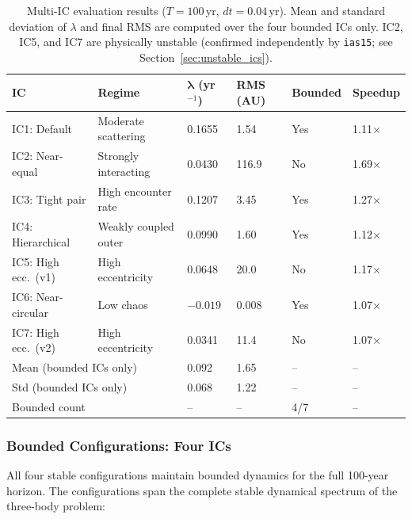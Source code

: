 \documentclass[12pt]{article}
\begin{document}
\begin{table}[H]
\centering
\caption{Multi-IC evaluation results ($T = 100$\,yr, $dt = 0.04$\,yr). Mean and
standard deviation of $\lambda$ and final RMS are computed over the four bounded ICs
only. IC2, IC5, and IC7 are physically unstable (confirmed independently by
\texttt{ias15}; see Section~\ref{sec:unstable_ics}).}
\label{tab:multi_ic}
\begin{tabular}{@{}llllll@{}}
\toprule
\textbf{IC} & \textbf{Regime} & $\boldsymbol{\lambda}$ (yr$^{-1}$) & \textbf{RMS (AU)} & \textbf{Bounded} & \textbf{Speedup} \\
\midrule
IC1: Default & Moderate scattering & 0.1655 & 1.54 & Yes & 1.11$\times$ \\
IC2: Near-equal & Strongly interacting & 0.0430 & 116.9 & No & 1.69$\times$ \\
IC3: Tight pair & High encounter rate & 0.1207 & 3.45 & Yes & 1.27$\times$ \\
IC4: Hierarchical & Weakly coupled outer & 0.0990 & 1.60 & Yes & 1.12$\times$ \\
IC5: High ecc.\ (v1) & High eccentricity & 0.0648 & 20.0 & No & 1.17$\times$ \\
IC6: Near-circular & Low chaos & $-0.019$ & 0.008 & Yes & 1.07$\times$ \\
IC7: High ecc.\ (v2) & High eccentricity & 0.0341 & 11.4 & No & 1.07$\times$ \\
\midrule
\multicolumn{2}{l}{Mean (bounded ICs only)} & 0.092 & 1.65 & -- & -- \\
\multicolumn{2}{l}{Std (bounded ICs only)} & 0.068 & 1.22 & -- & -- \\
\multicolumn{2}{l}{Bounded count} & -- & -- & 4/7 & -- \\
\bottomrule
\end{tabular}
\end{table}

\subsubsection{Bounded Configurations: Four ICs}
\label{sec:bounded_ics}

All four stable configurations maintain bounded dynamics for the full 100-year
horizon. The configurations span the complete stable dynamical spectrum of the
three-body problem:
\end{document}

